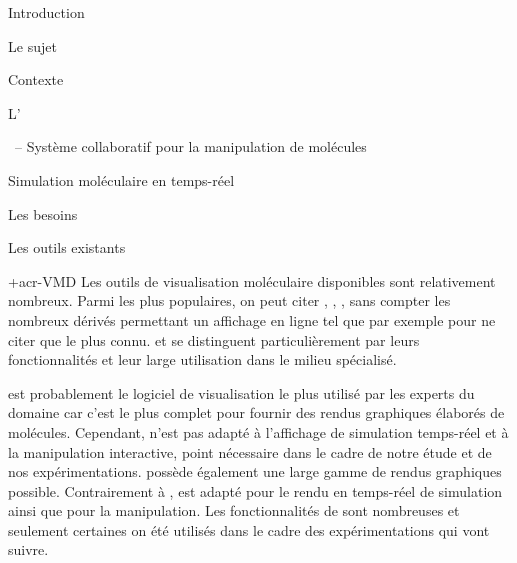 \documentclass[myfrancais]{mythesis}
\begin{document}
\begin{mypart}{Introduction}
\begin{mychapter}{Le sujet}
\begin{mysection}{Contexte}
\begin{mysubsection}{L'}
				\end{mysubsection}
			\end{mysection}
		\end{mychapter}
		\begin{mychapter}{\myShaddock\ -- Système collaboratif pour la manipulation de molécules}
			\begin{mysection}{Simulation moléculaire en temps-réel}
				\begin{mysubsection}{Les besoins}
				\end{mysubsection}
				\begin{mysubsection}{Les outils existants}
					\begin{mysubsubsection}{\myacronl+{acr-VMD}}
						Les outils de visualisation moléculaire disponibles sont relativement nombreux.
						Parmi les plus populaires, on peut citer \myPyMOL {},  , \myChimera {}, \myRasmol {} sans compter les nombreux dérivés permettant un affichage en ligne tel que \myJmol {} par exemple pour ne citer que le plus connu.
						\myPyMOL et  se distinguent particulièrement par leurs fonctionnalités et leur large utilisation dans le milieu spécialisé.

						\myPyMOL est probablement le logiciel de visualisation le plus utilisé par les experts du domaine car c'est le plus complet pour fournir des rendus graphiques élaborés de molécules.
						Cependant, \myPyMOL n'est pas adapté à l'affichage de simulation temps-réel et à la manipulation interactive, point nécessaire dans le cadre de notre étude et de nos expérimentations.
						 possède également une large gamme de rendus graphiques possible.
						Contrairement à \myPyMOL,  est adapté pour le rendu en temps-réel de simulation ainsi que pour la manipulation.
						Les fonctionnalités de  sont nombreuses et seulement certaines on été utilisés dans le cadre des expérimentations qui vont suivre.


\end{mysubsubsection}
\end{mysubsection}
\end{mysection}
\end{mychapter}
\end{mypart}
\end{document}
